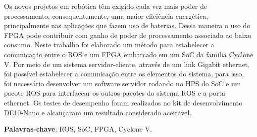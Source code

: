 
\setlength{\absparsep}{18pt} %
\begin{resumo}
    Os novos projetos em robótica têm exigido cada vez mais poder de processamento, consequentemente, uma maior eficiência energética, principalmente nas aplicações que fazem uso de baterias. Dessa maneira o uso do FPGA pode contribuir com ganho de poder de processamento associado ao baixo consumo. Neste trabalho foi elaborado um método para estabelecer a comunicação entre o ROS e um FPGA embarcado em um SoC da família Cyclone V. Por meio de um sistema servidor-cliente, através de um link Gigabit ethernet, foi possível estabelecer a comunicação entre os elementos do sistema, para isso, foi necessário desenvolver um software servidor rodando no HPS do SoC e um pacote ROS para interfacear os outros pacotes do sistema ROS e a porta ethernet. Os testes de desempenho foram realizados no kit de desenvolvimento DE10-Nano e alcançaram um resultado considerado aceitável.

 \textbf{Palavras-chave}: ROS, SoC, FPGA, Cyclone V.
\end{resumo}